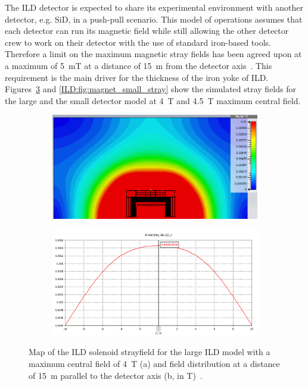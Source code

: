 The ILD detector is expected to share its experimental environment with another detector, e.g. SiD, in a push-pull scenario. This model of operations assumes that each detector can run its magnetic field while still allowing the other detector crew to work on their detector with the use of standard iron-based tools. Therefore a limit on the maximum magnetic stray fields has been agreed upon at a maximum of 5~mT at a distance of 15~m from the detector axis~\cite{Parker:2009zz}. This requirement is the main driver for the thickness of the iron yoke of ILD. Figures~\ref{ILD:fig:magnet_nominal_stray} and \ref{ILD:fig:magnet_small_stray} show the simulated stray fields for the large and the small detector model at 4~T and 4.5~T maximum central field.
\begin{figure}[t]
\begin{center}
\begin{subfigure}{0.75\hsize} \includegraphics[width=\textwidth]{Integration/fig/strayfield_nominal_4.png}
\caption{ \label{ild:fig:magnet_nominal_stray_map}}
 \end{subfigure}
\hspace{0.03\textwidth}
\begin{subfigure}{0.75\hsize} \includegraphics[width=\textwidth]{Integration/fig/strayfield_nominal_4_plot.png}
\caption{  \label{ild:fig:magnet_nominal_stray_field}}
 \end{subfigure}
\end{center}
\caption{Map of the ILD solenoid strayfield for the large ILD model with a maximum central field of 4~T (a) and field distribution at a distance of 15~m parallel to the detector axis (b, in T)~\cite{ild:bib:Magnet_Simulations}.}
\label{ILD:fig:magnet_nominal_stray}
\end{figure}

